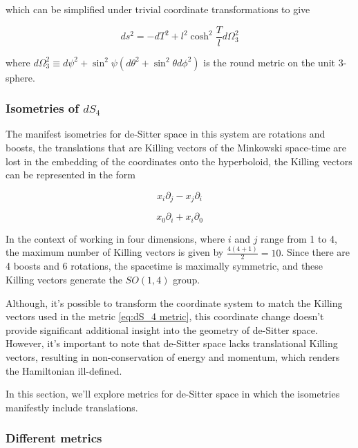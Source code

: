 \documentclass[a4paper,11pt]{article}
\numberwithin{equation}{section}
\numberwithin{figure}{section}
\begin{document}
\begin{large}
which can be simplified under trivial coordinate transformations to give

\begin{equation}
\label{eq:dS_4 metric}
    ds^2=-dT^2+l^2\cosh^2 \frac{T}{l} d\Omega^2_3
\end{equation}

where $d\Omega^2_3 \equiv d\psi^2+\sin^2\psi(d\theta^2+\sin^2\theta d\phi^2) $ is the round metric on the unit 3-sphere.


\subsubsection{Isometries of $dS_4$}

The manifest isometries for de-Sitter space in this system are rotations and boosts, the translations that are Killing vectors of the Minkowski space-time are lost in the embedding of the coordinates onto the hyperboloid, the Killing vectors can be represented in the form

\begin{equation}
\label{eq:dS_4 Killingrot}
    x_i\partial_j-x_j\partial_i
\end{equation}

\begin{equation}
\label{eq:dS_4 Killingboost}
    x_0\partial_i+x_i\partial_0
\end{equation}


In the context of working in four dimensions, where $i$ and $j$ range from 1 to 4, the maximum number of Killing vectors is given by $\frac{4(4+1)}{2}=10$. Since there are 4 boosts and 6 rotations, the spacetime is maximally symmetric, and these Killing vectors generate the $SO(1,4)$ group.

Although, it's possible to transform the coordinate system to match the Killing vectors used in the metric \eqref{eq:dS_4 metric}, this coordinate change doesn't provide significant additional insight into the geometry of de-Sitter space. However, it's important to note that de-Sitter space lacks translational Killing vectors, resulting in non-conservation of energy and momentum, which renders the Hamiltonian ill-defined.

In this section, we'll explore metrics for de-Sitter space in which the isometries manifestly include translations.

\subsubsection{Different metrics}


\end{large}
\end{document}
